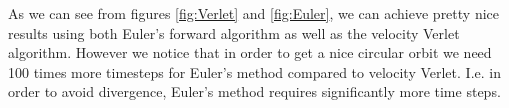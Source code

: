 \documentclass[a4paper, fontsize=11pt]{article}
\begin{document}
As we can see from figures \ref{fig:Verlet} and \ref{fig:Euler}, we can achieve pretty nice results using both Euler's forward algorithm as well as the velocity Verlet algorithm. However we notice that in order to get a nice circular orbit we need 100 times more timesteps for Euler's method compared to velocity Verlet. I.e. in order to avoid divergence, Euler's method requires significantly more time steps.









\end{document}
